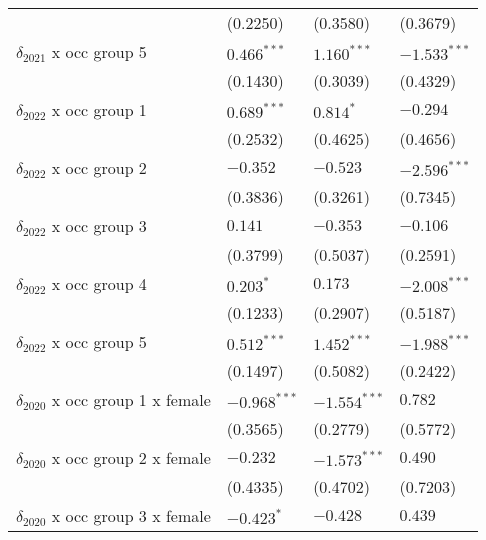 \begin{tabular}{llll}
                                       &           (0.2250) &           (0.3580) &           (0.3679) \\
$\delta_{2021}$ x occ group 5          &      $0.466^{***}$ &      $1.160^{***}$ &     $-1.533^{***}$ \\
                                       &           (0.1430) &           (0.3039) &           (0.4329) \\
$\delta_{2022}$ x occ group 1          &      $0.689^{***}$ &          $0.814^*$ &           $-0.294$ \\
                                       &           (0.2532) &           (0.4625) &           (0.4656) \\
$\delta_{2022}$ x occ group 2          &           $-0.352$ &           $-0.523$ &     $-2.596^{***}$ \\
                                       &           (0.3836) &           (0.3261) &           (0.7345) \\
$\delta_{2022}$ x occ group 3          &            $0.141$ &           $-0.353$ &           $-0.106$ \\
                                       &           (0.3799) &           (0.5037) &           (0.2591) \\
$\delta_{2022}$ x occ group 4          &          $0.203^*$ &            $0.173$ &     $-2.008^{***}$ \\
                                       &           (0.1233) &           (0.2907) &           (0.5187) \\
$\delta_{2022}$ x occ group 5          &      $0.512^{***}$ &      $1.452^{***}$ &     $-1.988^{***}$ \\
                                       &           (0.1497) &           (0.5082) &           (0.2422) \\
$\delta_{2020}$ x occ group 1 x female &     $-0.968^{***}$ &     $-1.554^{***}$ &            $0.782$ \\
                                       &           (0.3565) &           (0.2779) &           (0.5772) \\
$\delta_{2020}$ x occ group 2 x female &           $-0.232$ &     $-1.573^{***}$ &            $0.490$ \\
                                       &           (0.4335) &           (0.4702) &           (0.7203) \\
$\delta_{2020}$ x occ group 3 x female &         $-0.423^*$ &           $-0.428$ &            $0.439$ \\

\end{tabular}

